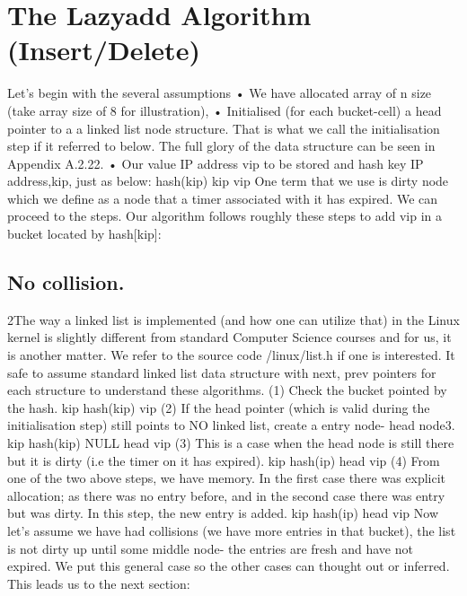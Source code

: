 \section{The Lazyadd Algorithm (Insert/Delete)}
Let’s begin with the several assumptions
• We have allocated array of n size (take array size of 8 for illustration),
• Initialised (for each bucket-cell) a head pointer to a a linked list node
structure. That is what we call the initialisation step if it referred to
below. The full glory of the data structure can be seen in Appendix
A.2.22.
• Our value IP address vip to be stored and hash key IP address,kip, just
as below:
hash(kip)
kip
vip
One term that we use is dirty node which we define as a node that a timer
associated with it has expired. We can proceed to the steps.
Our algorithm follows roughly these steps to add vip in a bucket located by
hash[kip]:
\subsection{No collision.}
2The way a linked list is implemented (and how one can utilize that) in the Linux kernel is slightly
different from standard Computer Science courses and for us, it is another matter. We refer to the
source code /linux/list.h if one is interested. It safe to assume standard linked list data structure
with next, prev pointers for each structure to understand these algorithms.
(1) Check the bucket pointed by the hash.
kip
hash(kip)
vip
(2) If the head pointer (which is valid during the initialisation step) still points
to NO linked list, create a entry node- head node3.
kip
hash(kip)
NULL
head
vip
(3) This is a case when the head node is still there but it is dirty (i.e the timer
on it has expired).
kip
hash(ip)
head
vip
(4) From one of the two above steps, we have memory. In the first case there
was explicit allocation; as there was no entry before, and in the second
case there was entry but was dirty. In this step, the new entry is added.
kip
hash(ip)
head
vip
Now let’s assume we have had collisions (we have more entries in that bucket),
the list is not dirty up until some middle node- the entries are fresh and have not
expired. We put this general case so the other cases can thought out or inferred.
This leads us to the next section:
